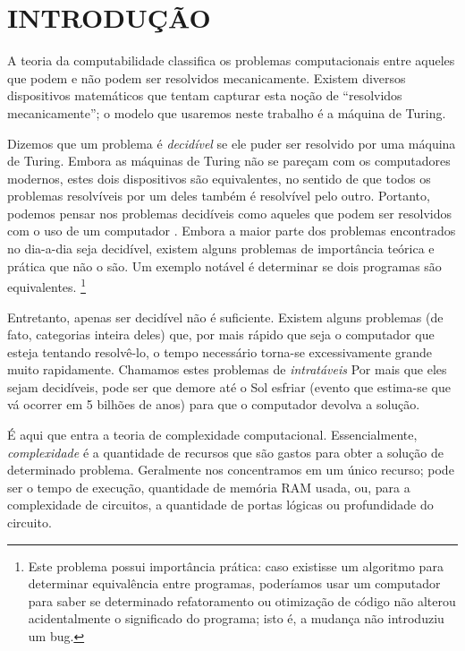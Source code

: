\chapter{INTRODUÇÃO}

A teoria da computabilidade
classifica os problemas computacionais entre
aqueles que podem e não podem ser resolvidos mecanicamente.
Existem diversos dispositivos matemáticos
que tentam capturar esta noção de
``resolvidos mecanicamente'';
o modelo que usaremos neste trabalho é a máquina de Turing.

Dizemos que um problema é \emph{decidível}
se ele puder ser resolvido por uma máquina de Turing.
Embora as máquinas de Turing
não se pareçam com os computadores modernos,
estes dois dispositivos são equivalentes,
no sentido de que
todos os problemas resolvíveis por um deles
também é resolvível pelo outro.
Portanto, podemos pensar nos problemas decidíveis
como aqueles que podem ser resolvidos com o uso de um computador
\cite[p. 307]{HopcroftMotwaniUllman2001}.
Embora a maior parte dos problemas
encontrados no dia-a-dia seja decidível,
existem alguns problemas de importância teórica e prática
que não o são.
Um exemplo notável é determinar se dois programas são equivalentes.
\footnote{
    Este problema possui importância prática:
    caso existisse um algoritmo para determinar equivalência entre programas,
    poderíamos usar um computador para saber se
    determinado refatoramento ou otimização de código
    não alterou acidentalmente o significado do programa;
    isto é, a mudança não introduziu um bug.
}

Entretanto,
apenas ser decidível não é suficiente.
Existem alguns problemas
(de fato, categorias inteira deles)
que, por mais rápido que seja o computador
que esteja tentando resolvê-lo,
o tempo necessário torna-se excessivamente grande
muito rapidamente.
Chamamos estes problemas de \emph{intratáveis}
\cite[p. 1]{HopcroftMotwaniUllman2001}
Por mais que eles sejam decidíveis,
pode ser que demore até o Sol esfriar
(evento que estima-se que vá ocorrer em 5 bilhões de anos)
para que o computador devolva a solução.

É aqui que entra a teoria de complexidade computacional.
Essencialmente,
\emph{complexidade}
é a quantidade de recursos que são gastos
para obter a solução de determinado problema.
Geralmente nos concentramos em um único recurso;
pode ser o tempo de execução,
quantidade de memória RAM usada,
ou,
para a complexidade de circuitos,
a quantidade de portas lógicas
ou profundidade do circuito.


